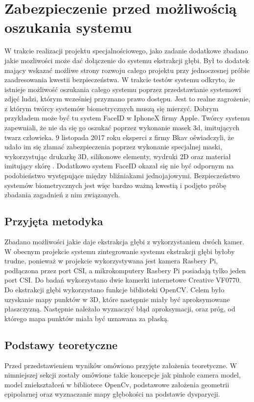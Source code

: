 \documentclass[oneside, eng]{mgr}
\begin{document}
\chapter{Zabezpieczenie przed możliwością oszukania systemu}

W trakcie realizacji projektu specjalnościowego, jako zadanie dodatkowe zbadano jakie mozliwości może dać dołączenie do systemu ekstrakcji głębi. Był to dodatek mający wskazać możliwe strony rozwoju całego projektu przy jednoczesnej próbie zaadresowania kwestii bezpieczeństwa. W trakcie testów systemu odkryto, że istnieje możliwość oszukania całego systemu poprzez przedstawianie systemowi zdjęć ludzi, którym wcześniej przyznano prawo dostępu. Jest to realne zagrożenie, z którym twórcy systemów biometrycznych muszą się mierzyć. Dobrym przykładem może być tu system FaceID w IphoneX firmy Apple. Twórcy systemu zapewniali, że nie da się go oszukać poprzez wykonanie masek 3d, imitujących twarz człowieka. 9 listopada 2017 roku eksperci z firmy Bkav oświadczyli, że udało im się złamać zabezpieczenia poprzez wykonanie specjalnej maski, wykorzystując drukarkę 3D, silikonowe elementy, wydruki 2D oraz materiał imitujący skórę \cite{FaceID hacked}. Dodatkowo system FaceID okazał się nie być odpornym na podobieństwo występujące między bliźniakami jednojajowymi. Bezpieczeństwo systemów biometrycznych jest więc bardzo ważną kwestią i podjęto próbę zbadania zagadnień z nim związanych.

\section{Przyjęta metodyka}
Zbadano możliwości jakie daje ekstrakcja głębi z wykorzystaniem dwóch kamer. W obecnym projekcie systemu zintegrowanie systemu ekstrakcji głębi byłoby trudne, ponieważ w projekcie wykorzystywana jest kamera Rasbery Pi, podłączona przez port CSI, a mikrokomputery Rasbery Pi posiadają tylko jeden port CSI. Do badań wykorzystano dwie kamerki internetowe Creative VF0770. Do ekstrakcji głębi wykorzystano funkcje biblioteki OpenCV. Celem było uzyskanie mapy punktów w 3D, które następnie miały być aproksymowane płaszczyzną. Następnie należało wyznaczyć błąd aproksymacji, oraz próg, od którego mapa punktów miała być uznawana za płaską.

\section{Podstawy teoretyczne}

Przed przedstawieniem wyników omówiono przyjęte założenia teoretyczne. W nimniejszej sekcji zostały omówione takie koncepcje jak pinhole camera model, model zniekształceń w bibliotece OpenCv, podstawowe założenia geometrii epipolarnej oraz wyznaczanie mapy głębokości na podstawie dysparycji.
\end{document}
